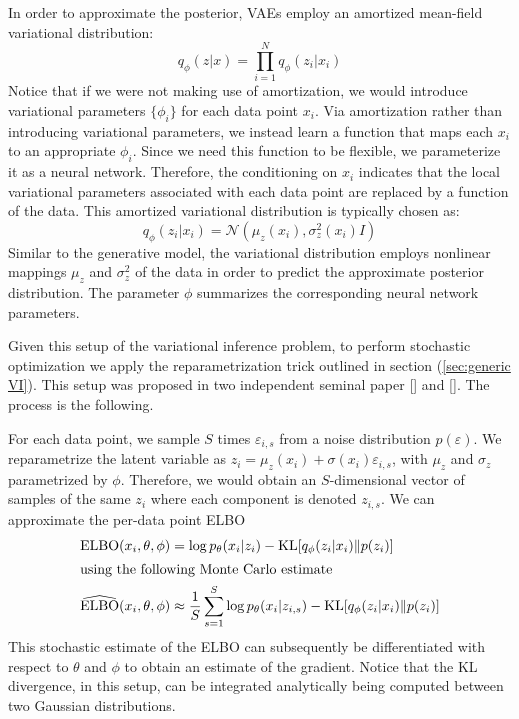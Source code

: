 In order to approximate the posterior, VAEs employ an amortized mean-field variational distribution: 
$$q_\phi(z|x) = \prod_{i=1}^{N} q_\phi(z_i|x_i)$$
Notice that if we were not making use of amortization, we would introduce variational parameters $\{\phi_i\}$ for each data point $x_i$. Via amortization rather than introducing variational parameters, we instead learn a function that maps each $x_i$ to an appropriate $\phi_i$. Since we need this function to be flexible, we parameterize it as a neural network. Therefore, the conditioning on $x_i$ indicates that the local variational parameters associated with each data point are replaced by a function of the data. This amortized variational distribution is typically chosen as:
$$q_\phi(z_i|x_i) = \mathcal{N}\left(\mu_z(x_i), \sigma^2_z(x_i)I\right)$$
Similar to the generative model, the variational distribution employs nonlinear mappings $\mu_z$ and $\sigma^2_z$ of the data in order to predict the approximate posterior distribution. The parameter $\phi$ summarizes the corresponding neural network parameters.

Given this setup of the variational inference problem, to perform stochastic optimization we apply the reparametrization trick outlined in section (\cref{sec:generic VI}). This setup was proposed in two independent seminal paper [\cite{Kingma2013}] and [\cite{Rezende2014}]. The process is the following.

For each data point, we sample $S$ times $\varepsilon_{i,s}$ from a noise distribution $p(\varepsilon)$. We reparametrize the latent variable as $z_{i} = \mu_z(x_i) + \sigma(x_i)\varepsilon_{i,s}$, with $\mu_z$ and $\sigma_z$ parametrized by $\phi$. Therefore, we would obtain an $S$-dimensional vector of samples of the same $z_i$ where each component is denoted $z_{i,s}$. We can approximate the per-data point ELBO
\begin{align*}
    \mathrm{ELBO}(x_i,\theta,\phi) &= \log p_\theta(x_i|z_i) - \mathrm{KL}[q_\phi(z_i|x_i)\Vert p(z_i)]\\
    \intertext{using the following Monte Carlo estimate}
    \widehat{\mathrm{ELBO}}(x_i,\theta,\phi) &\approx \frac{1}{S}\sum_{s=1}^{S} \log p_\theta(x_i|z_{i,s}) - \mathrm{KL}[q_\phi(z_i|x_i)\Vert p(z_i)]
\end{align*}
This stochastic estimate of the ELBO can subsequently be differentiated with respect to $\theta$ and $\phi$ to obtain an estimate of the gradient. Notice that the KL divergence, in this setup, can be integrated analytically being computed between two Gaussian distributions.



